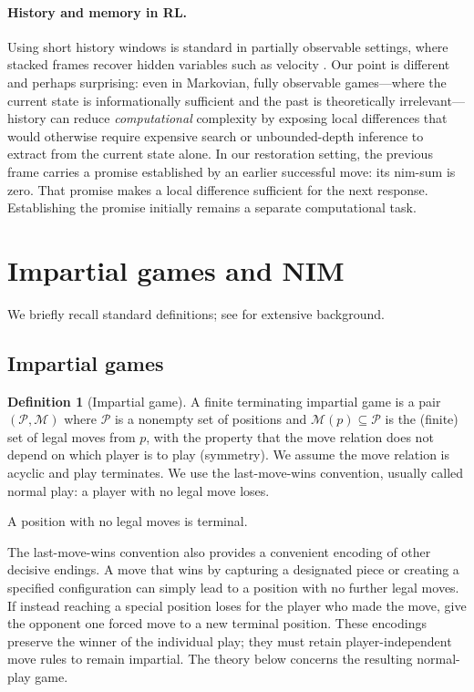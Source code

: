 \documentclass[11pt]{article}
\theoremstyle{plain}
\theoremstyle{definition}
\newtheorem{definition}[theorem]{Definition}
\theoremstyle{remark}
\numberwithin{equation}{section}
\begin{document}
\paragraph{History and memory in RL.}
Using short history windows is standard in partially observable settings, where stacked frames recover hidden variables such as velocity \cite{mnih2015humanlevel}.
Our point is different and perhaps surprising: even in Markovian, fully observable games---where the current state is informationally sufficient and the past is theoretically irrelevant---history can reduce \emph{computational} complexity by exposing local differences that would otherwise require expensive search or unbounded-depth inference to extract from the current state alone.
In our restoration setting, the previous frame carries a promise established by an earlier successful move: its nim-sum is zero. That promise makes a local difference sufficient for the next response. Establishing the promise initially remains a separate computational task.


\section{Impartial games and NIM}
\label{sec:impartial}

We briefly recall standard definitions; see \cite{berlekamp2001winningways} for extensive background.

\subsection{Impartial games}
\begin{definition}[Impartial game]
\label{def:impartial}
A finite terminating impartial game is a pair $(\mathcal{P},\mathcal{M})$ where $\mathcal{P}$ is a nonempty set of positions and $\mathcal{M}(p)\subseteq \mathcal{P}$ is the (finite) set of legal moves from $p$, with the property that the move relation does not depend on which player is to play (symmetry). We assume the move relation is acyclic and play terminates. We use the last-move-wins convention, usually called normal play: a player with no legal move loses.
\end{definition}

A position with no legal moves is terminal.

The last-move-wins convention also provides a convenient encoding of other decisive endings. A move that wins by capturing a designated piece or creating a specified configuration can simply lead to a position with no further legal moves. If instead reaching a special position loses for the player who made the move, give the opponent one forced move to a new terminal position. These encodings preserve the winner of the individual play; they must retain player-independent move rules to remain impartial. The theory below concerns the resulting normal-play game.
\end{document}
